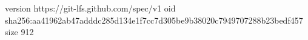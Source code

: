 version https://git-lfs.github.com/spec/v1
oid sha256:aa41962ab47adddc285d134e1f7cc7d305be9b38020c7949707288b23bedf457
size 912
